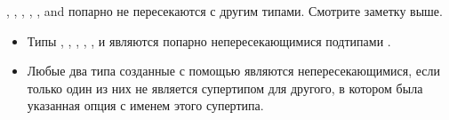 , , , ,
, and  
попарно не пересекаются с другим типами. Смотрите заметку выше.

\begin{itemize}
\item
Типы , ,
, , ,
 и
 являются попарно непересекающимися подтипами .
\end{itemize}

\begin{itemize}
\item
Любые два типа созданные с помощью   являются непересекающимися,
если только один из них не является супертипом для другого, в котором была
указанная опция  с именем этого супертипа.
\end{itemize}

\fi
